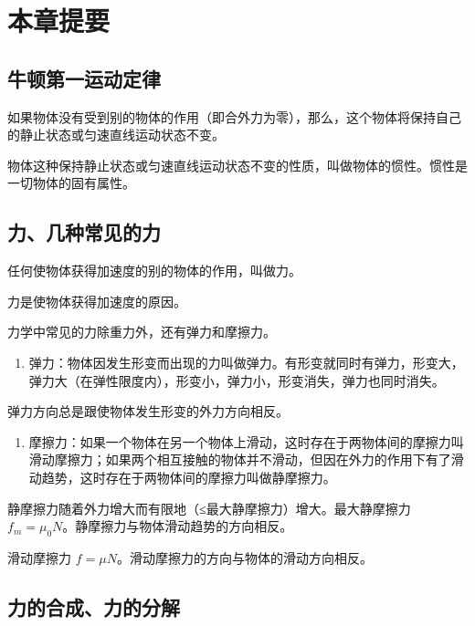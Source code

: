 \section{本章提要}\label{ux672cux7ae0ux63d0ux8981-5}

\subsection{牛顿第一运动定律}\label{ux725bux987fux7b2cux4e00ux8fd0ux52a8ux5b9aux5f8b-1}

如果物体没有受到别的物体的作用（即合外力为零），那么，这个物体将保持自己的静止状态或匀速直线运动状态不变。

物体这种保持静止状态或匀速直线运动状态不变的性质，叫做物体的惯性。惯性是一切物体的固有属性。

\subsection{力、几种常见的力}\label{ux529bux51e0ux79cdux5e38ux89c1ux7684ux529b}

任何使物体获得加速度的别的物体的作用，叫做力。

力是使物体获得加速度的原因。

力学中常见的力除重力外，还有弹力和摩擦力。

\begin{enumerate}
\def\labelenumi{\arabic{enumi}.}
\tightlist
\item
  弹力：物体因发生形变而出现的力叫做弹力。有形变就同时有弹力，形变大，弹力大（在弹性限度内），形变小，弹力小，形变消失，弹力也同时消失。
\end{enumerate}

弹力方向总是跟使物体发生形变的外力方向相反。

\begin{enumerate}
\def\labelenumi{\arabic{enumi}.}
\setcounter{enumi}{1}
\tightlist
\item
  摩擦力：如果一个物体在另一个物体上滑动，这时存在于两物体间的摩擦力叫滑动摩擦力；如果两个相互接触的物体并不滑动，但因在外力的作用下有了滑动趋势，这时存在于两物体间的摩擦力叫做静摩擦力。
\end{enumerate}

静摩擦力随着外力增大而有限地（≤最大静摩擦力）增大。最大静摩擦力
\(f_{m}=\mu_{0}N\)。静摩擦力与物体滑动趋势的方向相反。

滑动摩擦力 \(f = \mu N\)。滑动摩擦力的方向与物体的滑动方向相反。

\subsection{力的合成、力的分解}\label{ux529bux7684ux5408ux6210ux529bux7684ux5206ux89e3}

